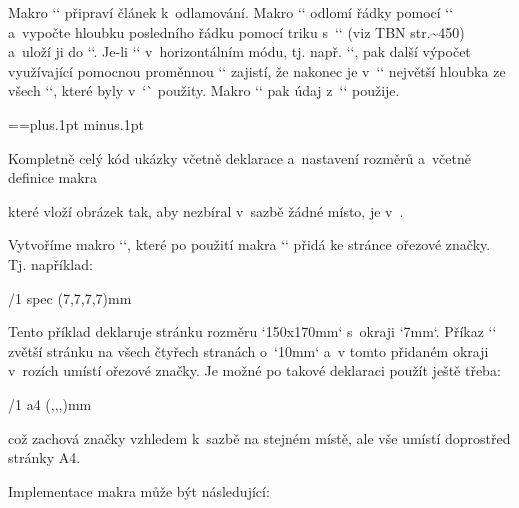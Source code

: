 {Makro `\ulamuj` připraví článek k~odlamování. Makro `\ulom` odlomí řádky pomocí `\vsplit` a~vypočte hloubku posledního řádku pomocí triku s~`\lastbox` (viz TBN str.\~{}450) a~uloží ji do `\lastdepth`. Je-li `\ulom` v~horizontálním módu, tj. např. `\hbox{\ulom[9]\ulom[9]\ulom[9]}`, pak další výpočet využívající pomocnou proměnnou `\maxhdepth` zajistí, že nakonec je v~`\lastdepth` největší hloubka ze všech `\ulom`, které byly v~`\hbox` použity. Makro `\vynech` pak údaj z~`\lastdepth` použije. 

\begtt
\tmpdim=\baselineskip  \splittopskip=\tmpdim plus.1pt minus.1pt 
\def\ulom[#1]{\setbox0=\vsplit\celybox to #1\baselineskip 
   \vtop{\kern-.3\baselineskip \unvbox0 
         \nointerlineskip\lastbox \global\lastdepth=\prevdepth}%
   \ifhmode \ifdim\lastdepth<\maxhdepth \global\lastdepth=\maxhdepth \fi 
            \maxhdepth=\lastdepth \fi 
} 
\def\ulamuj#1{\let\celybox=#1\setbox0=\vsplit\celybox to0pt} 
\def\vynech[#1]{\vskip-.7\baselineskip\vskip#1\baselineskip \prevdepth=\lastdepth} 
\endtt


Kompletně celý kód ukázky včetně deklarace a~nastavení rozměrů a~včetně definice makra 

\begtt
{} 
\endtt


které vloží obrázek tak, aby nezbíral v~sazbě žádné místo, je v~. 


 


Vytvoříme makro `\cropmarks`, které po použití makra `\margins` přidá ke stránce ořezové značky. Tj. například: 

\begtt
{} 
\margins/1 spec (7,7,7,7)mm \cropmarks 
\endtt


Tento příklad deklaruje stránku rozměru `150x170mm` s~okraji `7mm`. Příkaz `\cropmarks` zvětší stránku na všech čtyřech stranách o~`10mm` a~v tomto přidaném okraji v~rozích umístí ořezové značky. Je možné po takové deklaraci použít ještě třeba: 

\begtt
\margins/1 a4 (,,,)mm \cropcenter 
\endtt


což zachová značky vzhledem k~sazbě na stejném místě, ale vše umístí doprostřed stránky A4. 



Implementace makra může být následující: 

\begtt
\newdimen\cropw \cropw=10mm 
\def\ltcrop{\vbox{\hbox to\cropw{\hfil\vrule height\cropw depth-.2\cropw} 
                  \hbox to\cropw{\vrule height.4pt width.8\cropw \hfil}}} 
\def\rtcrop{\vbox{\hbox to\cropw{\vrule height\cropw depth-.2\cropw\hfil} 
                  \hbox to\cropw{\hfil\vrule height.4pt width.8\cropw}}} 
\def\lbcrop{\vbox{\hbox to\cropw{\vrule height.4pt width.8\cropw \hfil} 
                  \kern.2\cropw \hbox to\cropw{\hfil\vrule height.8\cropw}}} 
\def\rbcrop{\vbox{\hbox to\cropw{\hfil\vrule height.4pt width.8\cropw} 
                  \kern.2\cropw \hbox to\cropw{\vrule height.8\cropw\hfil}}} 
 
}
